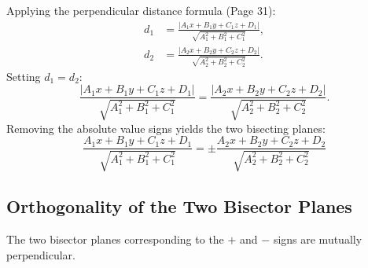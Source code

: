 \begin{center}
\end{center}

Applying the perpendicular distance formula (Page 31):
\begin{align}
    d_1 &= \frac{|A_1 x + B_1 y + C_1 z + D_1|}{\sqrt{A_1^2 + B_1^2 + C_1^2}}, \\
    d_2 &= \frac{|A_2 x + B_2 y + C_2 z + D_2|}{\sqrt{A_2^2 + B_2^2 + C_2^2}}.
\end{align}
Setting $d_1 = d_2$:
\begin{equation}
    \frac{|A_1 x + B_1 y + C_1 z + D_1|}{\sqrt{A_1^2 + B_1^2 + C_1^2}} = \frac{|A_2 x + B_2 y + C_2 z + D_2|}{\sqrt{A_2^2 + B_2^2 + C_2^2}}.
\end{equation}
Removing the absolute value signs yields the two bisecting planes:
\begin{equation}
    \boxed{\frac{A_1 x + B_1 y + C_1 z + D_1}{\sqrt{A_1^2 + B_1^2 + C_1^2}} = \pm \frac{A_2 x + B_2 y + C_2 z + D_2}{\sqrt{A_2^2 + B_2^2 + C_2^2}}}
\end{equation}

\subsection{Orthogonality of the Two Bisector Planes}
\begin{theorembox}
The two bisector planes corresponding to the $+$ and $-$ signs are mutually perpendicular.
\end{theorembox}

